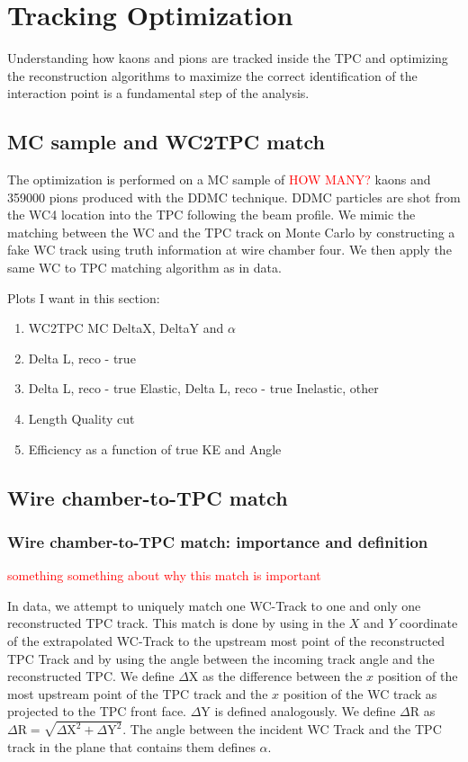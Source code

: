 \chapter{Tracking Optimization}
Understanding how kaons and pions are tracked inside the TPC and optimizing the reconstruction algorithms to maximize the correct identification of the interaction point is a fundamental step of the analysis. 


\section{MC sample and WC2TPC match}
The optimization is performed on a MC sample of \textcolor{red}{HOW MANY?} kaons and 359000 pions produced with the DDMC technique. DDMC particles are shot from the WC4 location into the TPC following the beam profile.
We mimic the matching between the WC and the TPC track on Monte Carlo by constructing a fake WC track using truth information at wire chamber four. We then apply the same WC to TPC matching algorithm as in data. 

Plots I want in this section:
\begin{enumerate}
\item WC2TPC MC DeltaX, DeltaY and $\alpha$
\item Delta L, reco - true
\item Delta L, reco - true Elastic, Delta L, reco - true Inelastic, other
\item Length Quality cut
\item Efficiency as a function of true KE and Angle
\end{enumerate}





\section{Wire chamber-to-TPC match}
\subsection{Wire chamber-to-TPC match: importance and definition}
\textcolor{red}{something something about why this match is important}

In data, we attempt to uniquely match one WC-Track to one and only one reconstructed TPC track. This match is done by using in the $X$ and $Y$ coordinate of the extrapolated WC-Track to the upstream most point of the reconstructed TPC Track and by using the angle between the incoming track angle and the reconstructed TPC. We define $\Delta$X as the difference between the $x$ position of the most upstream point of the TPC track and the $x$ position of the WC track as projected to the TPC front face. $\Delta$Y is defined analogously. We define  $\Delta$R as $ \Delta \text{R} =  \sqrt{ \Delta \text{X}^2 +  \Delta \text{Y}^2}  $. The angle between the incident WC Track and the TPC track in the plane that contains them defines $\alpha$.  

